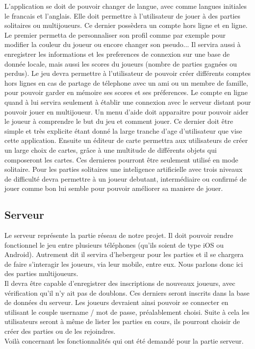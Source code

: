 \documentclass[]{report}
\begin{document}
		L'application se doit de pouvoir changer de langue, avec comme langues initiales le francais et l'anglais.
		Elle doit permettre à l'utilisateur de jouer à des parties solitaires ou multijoueurs. 
		Ce dernier possèdera un compte hors ligne et en ligne.		
		Le premier permetta de personnaliser son profil comme par exemple pour modifier
		la couleur du joueur ou encore changer son pseudo... Il servira aussi à enregistrer les informations
		et les preferences de connexion sur une base de donnée locale,
		mais aussi les scores du joueurs (nombre de parties gagnées ou perdus). 
		Le jeu devra permettre à l'utilisateur de pouvoir créer différents comptes hors lignes en cas de partage de télephone
		avec un ami ou un membre de famille, pour pouvoir garder en mémoire ses scores et ses préferences.		
		Le compte en ligne quand à lui servira seulement à établir une connexion avec le serveur distant pour pouvoir jouer en multijoueur.		
		Un menu d'aide doit apparaitre pour pouvoir aider le joueur à comprendre le but du jeu et comment jouer. 
		Ce dernier doit être simple et très explicite étant donné la large tranche d'age d'utilisateur que vise cette application.		
		Ensuite un éditeur de carte permettra aux utilisateurs de créer un large choix de cartes, 
		grâce à une multitude de différents objets qui composeront les cartes. Ces dernieres pourront être seulement utilisé en mode solitaire.
		Pour les parties solitaires une inteligence artificielle avec trois niveaux de difficulté 
		devra permettre à un joueur debutant, intermédiaire ou confirmé de jouer comme bon lui semble pour pouvoir améliorer sa maniere de jouer.
		
		\subsection{Serveur}
		
		Le serveur représente la partie réseau de notre projet. Il doit pouvoir
		rendre fonctionnel le jeu entre plusieurs téléphones (qu'ils soient de type
		iOS ou Android). Autrement dit il servira d'hebergeur pour les parties et
		il se chargera de faire s'interagir les joueurs, via leur mobile, entre eux.
		Nous parlons donc ici des parties multijoueurs.\\ 
		Il devra être capable d'enregistrer des inscriptions de nouveaux joueurs, avec
		vérification qu'il n'y ait pas de doublons. Ces derniers seront inscrits dans 
		la base de données du serveur. Les joueurs devraient ainsi
		pouvoir se connecter en utilisant le couple username / mot de passe,
		préalablement choisi. Suite à cela les utilisateurs seront à même de lister
		les parties en cours, ils pourront choisir de créer des parties ou de les rejoindres.\\
		Voilà concernant les fonctionnalités qui ont été demandé pour la partie
		serveur.
	
\end{document}
